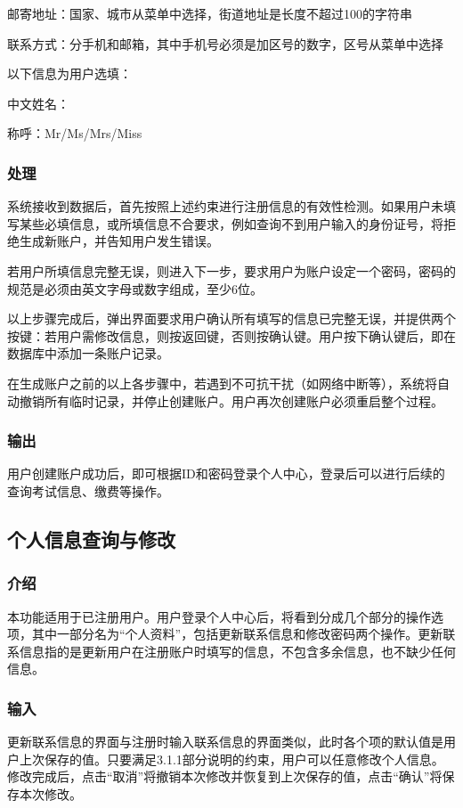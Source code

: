 	邮寄地址：国家、城市从菜单中选择，街道地址是长度不超过100的字符串

	联系方式：分手机和邮箱，其中手机号必须是加区号的数字，区号从菜单中选择

以下信息为用户选填：

	中文姓名：

	称呼：Mr/Ms/Mrs/Miss

\subsubsection{处理}
系统接收到数据后，首先按照上述约束进行注册信息的有效性检测。如果用户未填写某些必填信息，或所填信息不合要求，例如查询不到用户输入的身份证号，将拒绝生成新账户，并告知用户发生错误。

若用户所填信息完整无误，则进入下一步，要求用户为账户设定一个密码，密码的规范是必须由英文字母或数字组成，至少6位。

以上步骤完成后，弹出界面要求用户确认所有填写的信息已完整无误，并提供两个按键：若用户需修改信息，则按返回键，否则按确认键。用户按下确认键后，即在数据库中添加一条账户记录。

在生成账户之前的以上各步骤中，若遇到不可抗干扰（如网络中断等），系统将自动撤销所有临时记录，并停止创建账户。用户再次创建账户必须重启整个过程。

\subsubsection{输出}
用户创建账户成功后，即可根据ID和密码登录个人中心，登录后可以进行后续的查询考试信息、缴费等操作。

\subsection{个人信息查询与修改}

\subsubsection{介绍}
本功能适用于已注册用户。用户登录个人中心后，将看到分成几个部分的操作选项，其中一部分名为“个人资料”，包括更新联系信息和修改密码两个操作。更新联系信息指的是更新用户在注册账户时填写的信息，不包含多余信息，也不缺少任何信息。

\subsubsection{输入}
更新联系信息的界面与注册时输入联系信息的界面类似，此时各个项的默认值是用户上次保存的值。只要满足3.1.1部分说明的约束，用户可以任意修改个人信息。修改完成后，点击“取消”将撤销本次修改并恢复到上次保存的值，点击“确认”将保存本次修改。

